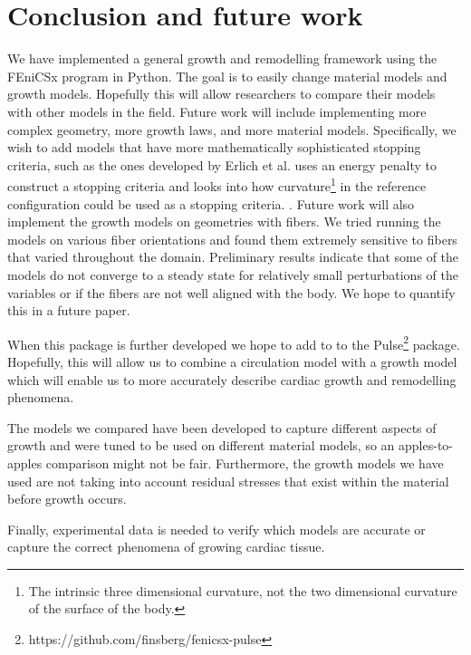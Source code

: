 \section{Conclusion and future work}
We have implemented a general growth and remodelling framework using the FEniCSx program in Python. The goal is to easily change material models and growth models. Hopefully this will allow researchers to compare their models with other models in the field. Future work will include implementing more complex geometry, more growth laws, and more material models. Specifically, we wish to add models that have more mathematically sophisticated stopping criteria, such as the ones developed by Erlich et al. \citep{Erlich2023} uses an energy penalty to construct a stopping criteria and \citep{Erlich2024} looks into how curvature\footnote{The intrinsic three dimensional curvature, not the two dimensional curvature of the surface of the body.} in the reference configuration could be used as a stopping criteria. . Future work will also implement the growth models on geometries with fibers. We tried running the models on various fiber orientations and found them extremely sensitive to fibers that varied throughout the domain. Preliminary results indicate that some of the models do not converge to a steady state for relatively small perturbations of the variables or if the fibers are not well aligned with the body. We hope to quantify this in a future paper. \par
When this package is further developed we hope to add to to the Pulse\footnote{https://github.com/finsberg/fenicsx-pulse} package. Hopefully, this will allow us to combine a circulation model with a growth model which will enable us to more accurately describe cardiac growth and remodelling phenomena. \par
The models we compared have been developed to capture different aspects of growth and were tuned to be used on different material models, so an apples-to-apples comparison might not be fair. Furthermore, the growth models we have used are not taking into account residual stresses that exist within the material before growth occurs. \par
Finally, experimental data is needed to verify which models are accurate or capture the correct phenomena of growing cardiac tissue.


% 
